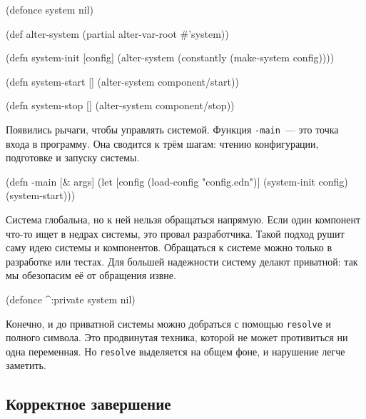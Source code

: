 
\begin{english}
  \begin{clojure}
(defonce system nil)

(def alter-system (partial alter-var-root #'system))

(defn system-init [config]
  (alter-system (constantly (make-system config))))

(defn system-start []
  (alter-system component/start))

(defn system-stop []
  (alter-system component/stop))
  \end{clojure}
\end{english}


Появились рычаги, чтобы управлять системой. Функция \verb|-main|~--- это точка
входа в программу. Она сводится к трём шагам: чтению конфигурации, подготовке и
запуску системы.

\begin{english}
  \begin{clojure}
(defn -main [& args]
  (let [config (load-config "config.edn")]
    (system-init config)
    (system-start)))
  \end{clojure}
\end{english}

Система глобальна, но к ней нельзя обращаться напрямую. Если один компонент
что-то ищет в недрах системы, это провал разработчика. Такой подход рушит саму
идею системы и компонентов. Обращаться к системе можно только в разработке или
тестах. Для большей надежности систему делают приватной: так мы обезопасим
её от обращения извне.


\begin{english}
  \begin{clojure}
(defonce ^:private system nil)
  \end{clojure}
\end{english}

Конечно, и до приватной системы можно добраться с помощью \verb|resolve| и
полного символа. Это продвинутая техника, которой не может противиться ни одна
переменная. Но \verb|resolve| выделяется на общем фоне, и нарушение легче
заметить.

\subsection{Корректное завершение}

